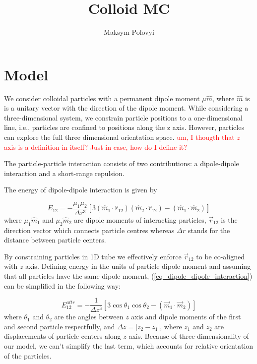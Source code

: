\documentclass[12pt,a4paper]{article}
\author{Maksym Polovyi}
\title{Colloid MC}
\begin{document}
\section{Model}

We consider colloidal particles with a permanent dipole moment $\mu \hat{m}$, where $\hat{m}$ is is a unitary vector with the direction of the dipole moment. While considering a three-dimensional system, we constrain particle positions to a one-dimensional line, i.e., particles are confined to positions along the z axis. However, particles can explore the full three dimensional orientation space. \textcolor{red}{um, I thougth that $z$ axis is a definition in itself? Just in case, how do I define it?}

The particle-particle interaction consists of two contributions: a dipole-dipole interaction and a short-range repulsion.

The energy of dipole-dipole interaction is given by

\label{eq_dipole_dipole_interaction}
\begin{equation}
E_{12} = - \frac{\mu_1 \mu_2}{\Delta r^3}[3 (\hat{m}_1 \cdot \hat{r}_{12})(\hat{m}_2 \cdot \hat{r}_{12}) - (\hat{m}_1 \cdot \hat{m}_2)]
\end{equation}
where $\mu_1 \hat{m}_1$ and $\mu_2 \hat{m}_2$ are dipole moments of interacting particles, $\vec{r}_{12}$ is the direction vector which connects particle centres whereas $\Delta r$ stands for the distance between particle centers.

By constraining particles in 1D tube we effectively enforce $\vec{r}_{12}$ to be co-aligned with $z$ axis. Defining energy in the units of particle dipole moment and assuming that all particles have the same dipole moment, (\ref{eq_dipole_dipole_interaction}) can be simplified in the following way:

\label{eq_dipole_dipole_1D}
\begin{equation}
E_{12}^{attr} = - \frac{1}{\Delta z^3} [3 \cos \theta_1 \cos \theta_2 - (\vec{m}_1 \cdot \vec{m}_2)]
\end{equation}
where $\theta_1$ and $\theta_2$ are the angles between $z$ axis and dipole moments of the first and second particle respectfully, and $\Delta z = |z_2 - z_1|$, where $z_1$ and $z_2$ are displacements of particle centers along $z$ axis. Because of three-dimensionality of our model, we can't simplify the last term, which accounts for relative orientation of the particles.
\end{document}

